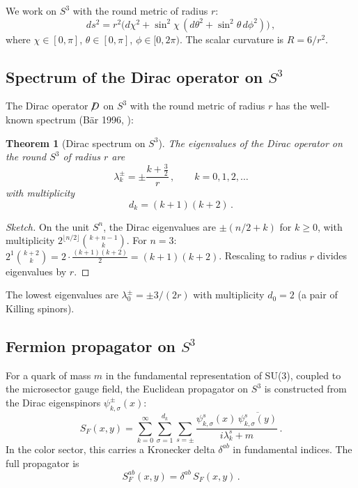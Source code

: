 \documentclass[11pt,a4paper]{article}
\newcommand{\Slashed}[1]{\!\not\!{#1}}
\newtheorem{theorem}{Theorem}
\theoremstyle{definition}
\theoremstyle{remark}
\begin{document}
We work on $S^3$ with the round metric of radius $r$:
\begin{equation}\label{eq:S3metric}
ds^2 = r^2\bigl(d\chi^2 + \sin^2\chi\,(d\theta^2 + \sin^2\theta\,d\phi^2)\bigr)\,,
\end{equation}
where $\chi \in [0,\pi]$, $\theta \in [0,\pi]$, $\phi \in [0,2\pi)$.
The scalar curvature is $R = 6/r^2$.

\subsection{Spectrum of the Dirac operator on $S^3$}
\label{sec:dirac-spectrum}

The Dirac operator $\Slashed{D}$ on $S^3$ with the round metric of
radius $r$ has the well-known spectrum (B\"ar 1996,
\cite{Bar1996}):

\begin{theorem}[Dirac spectrum on $S^3$]\label{thm:dirac-spectrum}
The eigenvalues of the Dirac operator on the round $S^3$ of radius $r$ are
\begin{equation}\label{eq:dirac-eigenvalues}
\lambda_k^{\pm} = \pm\frac{k + \tfrac{3}{2}}{r}\,,\qquad k = 0, 1, 2, \ldots
\end{equation}
with multiplicity
\begin{equation}\label{eq:dirac-mult}
d_k = (k+1)(k+2)\,.
\end{equation}
\end{theorem}

\begin{proof}[Sketch]
On the unit $S^n$, the Dirac eigenvalues are $\pm(n/2 + k)$ for
$k \geq 0$, with multiplicity $2^{\lfloor n/2 \rfloor}\binom{k+n-1}{k}$.
For $n = 3$: $2^1 \binom{k+2}{k} = 2\cdot\frac{(k+1)(k+2)}{2} = (k+1)(k+2)$.
Rescaling to radius $r$ divides eigenvalues by $r$.
\end{proof}

The lowest eigenvalues are $\lambda_0^{\pm} = \pm 3/(2r)$ with
multiplicity $d_0 = 2$ (a pair of Killing spinors).

\subsection{Fermion propagator on $S^3$}
\label{sec:fermion-prop}

For a quark of mass $m$ in the fundamental representation of SU(3),
coupled to the microsector gauge field, the Euclidean propagator on $S^3$
is constructed from the Dirac eigenspinors $\psi_{k,\sigma}^{\pm}(x)$:
\begin{equation}\label{eq:fermion-prop}
S_F(x,y) = \sum_{k=0}^{\infty}\sum_{\sigma=1}^{d_k}\sum_{s=\pm}
\frac{\psi_{k,\sigma}^{s}(x)\,\overline{\psi_{k,\sigma}^{s}(y)}}
{i\lambda_k^s + m}\,.
\end{equation}
In the color sector, this carries a Kronecker delta $\delta^{ab}$
in fundamental indices.  The full propagator is
\begin{equation}
S_F^{ab}(x,y) = \delta^{ab}\,S_F(x,y)\,.
\end{equation}
\end{document}
